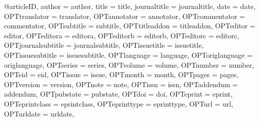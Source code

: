 \documentclass[landscape,a0paper,fontscale=0.285]{baposter} %
\begin{document}
\begin{poster}





@article{ID,
author = {author},
title = {title},
journaltitle = {journaltitle},
date = {date},
OPTtranslator = {translator},
OPTannotator = {annotator},
OPTcommentator = {commentator},
OPTsubtitle = {subtitle},
OPTtitleaddon = {titleaddon},
OPTeditor = {editor},
OPTeditora = {editora},
OPTeditorb = {editorb},
OPTeditorc = {editorc},
OPTjournalsubtitle = {journalsubtitle},
OPTissuetitle = {issuetitle},
OPTissuesubtitle = {issuesubtitle},
OPTlanguage = {language},
OPToriglanguage = {origlanguage},
OPTseries = {series},
OPTvolume = {volume},
OPTnumber = {number},
OPTeid = {eid},
OPTissue = {issue},
OPTmonth = {month},
OPTpages = {pages},
OPTversion = {version},
OPTnote = {note},
OPTissn = {issn},
OPTaddendum = {addendum},
OPTpubstate = {pubstate},
OPTdoi = {doi},
OPTeprint = {eprint},
OPTeprintclass = {eprintclass},
OPTeprinttype = {eprinttype},
OPTurl = {url},
OPTurldate = {urldate},
}




\end{poster}
\end{document}
